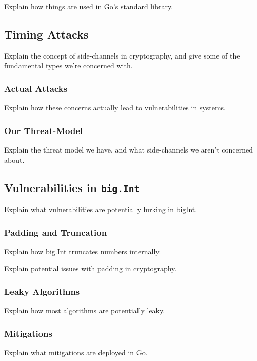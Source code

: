 \documentclass[11pt, a4paper, twocolumn]{article} %
\begin{document}
{Explain how things are used in Go's standard library.

\subsection{Timing Attacks}

Explain the concept of side-channels in cryptography, and give some of
the fundamental types we're concerned with.

\subsubsection{Actual Attacks}

Explain how these concerns actually lead to vulnerabilities in systems.

\subsubsection{Our Threat-Model}

Explain the threat model we have, and what side-channels we aren't concerned
about.

\subsection{Vulnerabilities in \texttt{big.Int}}

Explain what vulnerabilities are potentially lurking in bigInt.

\subsubsection{Padding and Truncation}

Explain how big.Int truncates numbers internally.

Explain potential issues with padding in cryptography.

\subsubsection{Leaky Algorithms}

Explain how most algorithms are potentially leaky.

\subsubsection{Mitigations}

Explain what mitigations are deployed in Go.

}
\end{document}
